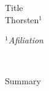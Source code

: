 \documentclass[a4paper]{scrartcl}
\begin{document}
\begin{center}
\Large{Title}\\

\vspace{0.5cm}
\normalsize{Thorsten$^1$}\\

\vspace{0.5cm}
\begin{scriptsize} \itshape
$^1$Afiliation
\end{scriptsize}\\ \normalfont
\vspace{0.5cm}
\end{center}

Summary
\end{document}
